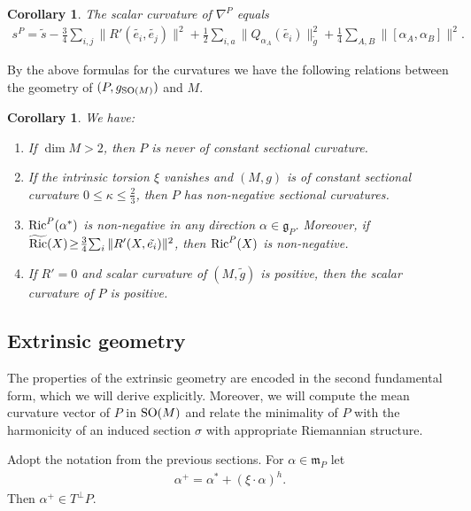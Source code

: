 \documentclass[pdftex]{sigma}
\numberwithin{equation}{section}
\newtheorem{Corollary}[Theorem]{Corollary}
\begin{document}
\begin{Corollary}\label{cor:scalarP}
The scalar curvature of $\nabla^P$ equals
\begin{gather*}
s^P=\tilde{s}-\frac{3}{4}\sum_{i,j}\|R'(\tilde{e_i},\tilde{e_j})\|^2+\frac{1}{2}\sum_{i,a}\|Q_{\alpha_A}(\tilde{e_i})\|^2_{\tilde{g}}
+\frac{1}{4}\sum_{A,B}\|[\alpha_A,\alpha_B]\|^2.
\end{gather*}
\end{Corollary}

By the above formulas for the curvatures we have the following relations between the geometry of $(P,g_{{\rm SO}(M)})$ and $M$.

\begin{Corollary}\label{cor:relPandtildeM}
We have:
\begin{enumerate}\itemsep=0pt
\item[$1.$] If $\dim M>2$, then $P$ is never of constant sectional curvature.
\item[$2.$]  If the intrinsic torsion $\xi$ vanishes and $(M,g)$ is of constant sectional curvature $0\leq \kappa\leq\frac{2}{3}$, then $P$ has non-negative sectional curvatures.
\item[$3.$]  ${\rm Ric}^P(\alpha^{\ast})$ is non-negative in any direction $\alpha\!\in\! \mathfrak{g}_P$. Moreover, if $\widetilde{\rm Ric}(X)\!\geq\! \frac{3}{4}\!\sum_i\|R'(X,\tilde{e_i})\|^2$, then ${\rm Ric}^P(X)$ is non-negative.
\item[$4.$]  If $R'=0$ and scalar curvature of $(M,\tilde{g})$ is positive, then the scalar curvature of $P$ is positive.
\end{enumerate}
\end{Corollary}

\subsection{Extrinsic geometry}

The properties of the extrinsic geometry are encoded in the second fundamental form, which we will derive explicitly. Moreover, we will compute the mean curvature vector of $P$ in ${\rm SO}(M)$ and relate the minimality of $P$ with the harmonicity of an induced section $\sigma$ with appropriate Riemannian structure.

Adopt the notation from the previous sections. For $\alpha\in\mathfrak{m}_P$ let
\begin{gather*}
\alpha^{+}=\alpha^{\ast}+(\xi\cdot\alpha)^h.
\end{gather*}
Then $\alpha^{+}\in T^{\bot}P$.
\end{document}
